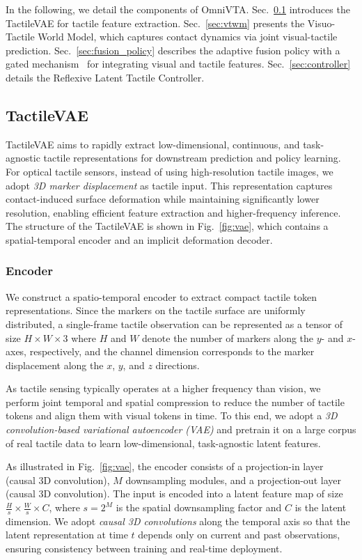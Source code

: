 In the following, we detail the components of OmniVTA. Sec.~\ref{sec:tacvae} introduces the TactileVAE for tactile feature extraction. Sec.~\ref{sec:vtwm} presents the Visuo-Tactile World Model, which captures contact dynamics via joint visual-tactile prediction. Sec.~\ref{sec:fusion_policy} describes the adaptive fusion policy with a gated mechanism~\cite{cao2023multi} for integrating visual and tactile features. Sec.~\ref{sec:controller} details the Reflexive Latent Tactile Controller.



\subsection{TactileVAE}
\label{sec:tacvae}
TactileVAE aims to rapidly extract low-dimensional, continuous, and task-agnostic tactile representations for downstream prediction and policy learning. For optical tactile sensors, instead of using high-resolution tactile images, we adopt \textit{3D marker displacement} as tactile input. This representation captures contact-induced surface deformation while maintaining significantly lower resolution, enabling efficient feature extraction and higher-frequency inference. The structure of the TactileVAE is shown in Fig.~\ref{fig:vae}, which contains a spatial-temporal encoder and an implicit deformation decoder.

\subsubsection{Encoder}
We construct a spatio-temporal encoder to extract compact tactile token representations. Since the markers on the tactile surface are uniformly distributed, a single-frame tactile observation can be represented as a tensor of size $H \times W \times 3$ where $H$ and $W$ denote the number of markers along the $y$- and $x$-axes, respectively, and the channel dimension corresponds to the marker displacement along the $x$, $y$, and $z$ directions.

As tactile sensing typically operates at a higher frequency than vision, we perform joint temporal and spatial compression to reduce the number of tactile tokens and align them with visual tokens in time. To this end, we adopt a \textit{3D convolution-based variational autoencoder (VAE)} and pretrain it on a large corpus of real tactile data to learn low-dimensional, task-agnostic latent features.

As illustrated in Fig.~\ref{fig:vae}, the encoder consists of a projection-in layer (causal 3D convolution), $M$ downsampling modules, and a projection-out layer (causal 3D convolution). The input is encoded into a latent feature map of size $\frac{H}{s} \times \frac{W}{s} \times C$, where $s = 2^M$ is the spatial downsampling factor and $C$ is the latent dimension. We adopt \textit{causal 3D convolutions} along the temporal axis so that the latent representation at time $t$ depends only on current and past observations, ensuring consistency between training and real-time deployment.

